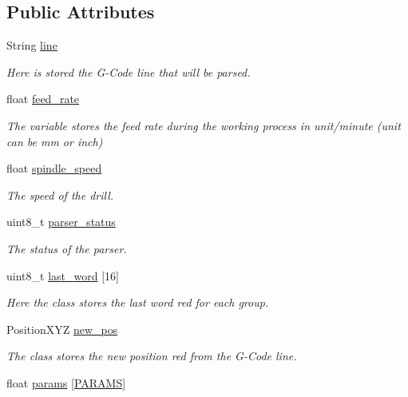\subsection*{Public Attributes}
\begin{DoxyCompactItemize}
\item 
String \hyperlink{class_g_code_a20d7c90740e9e139b24f68336ad8c8f1}{line}
\begin{DoxyCompactList}\small\item\em Here is stored the G-\/\+Code line that will be parsed. \end{DoxyCompactList}\item 
float \hyperlink{class_g_code_a0115efce11fdffa2c59304706ecacede}{feed\+\_\+rate}
\begin{DoxyCompactList}\small\item\em The variable stores the feed rate during the working process in unit/minute (unit can be mm or inch) \end{DoxyCompactList}\item 
float \hyperlink{class_g_code_a03613c115ef107290355c78384ebee27}{spindle\+\_\+speed}
\begin{DoxyCompactList}\small\item\em The speed of the drill. \end{DoxyCompactList}\item 
uint8\+\_\+t \hyperlink{class_g_code_a56d0e5e56115cd8e7b3f161cc8c0528e}{parser\+\_\+status}
\begin{DoxyCompactList}\small\item\em The status of the parser. \end{DoxyCompactList}\item 
uint8\+\_\+t \hyperlink{class_g_code_a3674417ee3c5141c6655c05f6ffa0799}{last\+\_\+word} \mbox{[}16\mbox{]}
\begin{DoxyCompactList}\small\item\em Here the class stores the last word red for each group. \end{DoxyCompactList}\item 
Position\+X\+Y\+Z \hyperlink{class_g_code_aadec9af8923a5dc95f9f7da8bccfc109}{new\+\_\+pos}
\begin{DoxyCompactList}\small\item\em The class stores the new position red from the G-\/\+Code line. \end{DoxyCompactList}\item 
float \hyperlink{class_g_code_a6f38c9dddbd7c12c786c6363fd2a369c}{params} \mbox{[}\hyperlink{_g_code__def_8h_ab0b1e59d96396ba9dca2147f9feb44eb}{P\+A\+R\+A\+M\+S}\mbox{]}

\end{DoxyCompactItemize}
